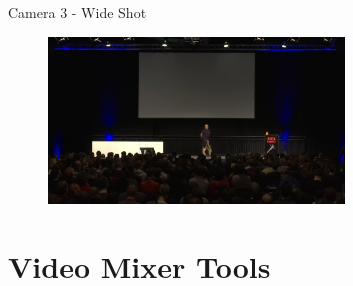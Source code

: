 \documentclass[aspectratio=169]{beamer}
\begin{document}
\begin{frame}{Camera 3 - Wide Shot}
	\begin{figure} 
		\centering
		\includegraphics[width=0.7\textwidth]{images/wide-shot.jpeg}
	\end{figure}
\end{frame}


\section{Video Mixer Tools}
\end{document}
